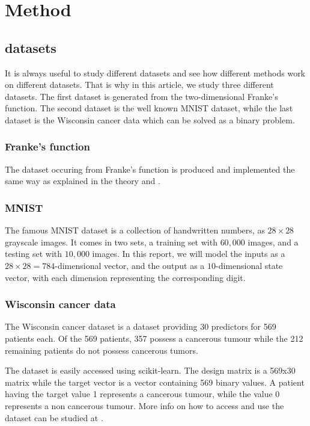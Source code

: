 \documentclass[../main.tex]{subfiles}
\begin{document}
\section{Method}
\subsection{datasets}
It is always useful to study different datasets and see how different methods work on different datasets. That is why in this article, we study three different datasets. The first dataset is generated from the two-dimensional Franke's function. The second dataset is the well known MNIST dataset, while the last dataset is the Wisconsin cancer data which can be solved as a binary problem.

\subsubsection{Franke's function}
The dataset occuring from Franke's function is produced and implemented the same way as explained in the theory and \cite{project1}.

\subsubsection{MNIST}
The famous MNIST dataset is a collection of handwritten numbers, as $28\times 28$ grayscale images. It comes in two sets, a training set with $60,000$ images, and a testing set with $10,000$ images. In this report, we will model the inputs as a $28\times 28 = 784$-dimensional vector, and the output as a $10$-dimensional state vector, with each dimension representing the corresponding digit.

\subsubsection{Wisconsin cancer data}
The Wisconsin cancer dataset is a dataset providing 30 predictors for 569 patients each. Of the 569 patients, 357 possess a cancerous tumour while the 212 remaining patients do not possess cancerous tumors.

The dataset is easily accessed using scikit-learn. The design matrix is a 569x30 matrix while the target vector is a vector containing 569 binary values. A patient having the target value 1 represents a cancerous tumour, while the value 0 represents a non cancerous tumour. More info on how to access and use the dataset can be studied at \cite{scikit-learn}.
\end{document}
